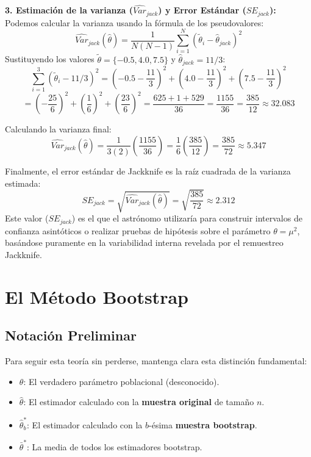 \documentclass[a4paper]{article}
\begin{document}
\textbf{3. Estimación de la varianza ($\widehat{Var}_{jack}$) y Error Estándar ($SE_{jack}$):}
Podemos calcular la varianza usando la fórmula de los pseudovalores:
$$ \widehat{Var}_{jack}(\hat{\theta}) = \frac{1}{N(N-1)} \sum_{i=1}^N (\tilde{\theta}_i - \hat{\theta}_{jack})^2 $$
Sustituyendo los valores $\tilde{\theta} = \{-0.5, 4.0, 7.5\}$ y $\hat{\theta}_{jack} = 11/3$:
$$ \sum_{i=1}^3 (\tilde{\theta}_i - 11/3)^2 = \left(-0.5 - \frac{11}{3}\right)^2 + \left(4.0 - \frac{11}{3}\right)^2 + \left(7.5 - \frac{11}{3}\right)^2 $$
$$ = \left(-\frac{25}{6}\right)^2 + \left(\frac{1}{6}\right)^2 + \left(\frac{23}{6}\right)^2 = \frac{625 + 1 + 529}{36} = \frac{1155}{36} = \frac{385}{12} \approx 32.083 $$

Calculando la varianza final:
$$ \widehat{Var}_{jack}(\hat{\theta}) = \frac{1}{3(2)} \left( \frac{1155}{36} \right) = \frac{1}{6} \left( \frac{385}{12} \right) = \frac{385}{72} \approx 5.347 $$


Finalmente, el error estándar de Jackknife es la raíz cuadrada de la varianza estimada:
$$ SE_{jack} = \sqrt{\widehat{Var}_{jack}(\hat{\theta})} = \sqrt{\frac{385}{72}} \approx 2.312 $$
Este valor ($SE_{jack}$) es el que el astrónomo utilizaría para construir intervalos de confianza asintóticos o realizar pruebas de hipótesis sobre el parámetro $\theta = \mu^2$, basándose puramente en la variabilidad interna revelada por el remuestreo Jackknife.


\newpage

\section{El Método Bootstrap}

\subsection{Notación Preliminar}
Para seguir esta teoría sin perderse, mantenga clara esta distinción fundamental:
\begin{itemize}
    \item $\theta$: El verdadero parámetro poblacional (desconocido).
    \item $\hat{\theta}$: El estimador calculado con la \textbf{muestra original} de tamaño $n$.
    \item $\hat{\theta}^*_b$: El estimador calculado con la $b$-ésima \textbf{muestra bootstrap}.
    \item $\bar{\theta}^*$: La media de todos los estimadores bootstrap.
\end{itemize}
\end{document}
